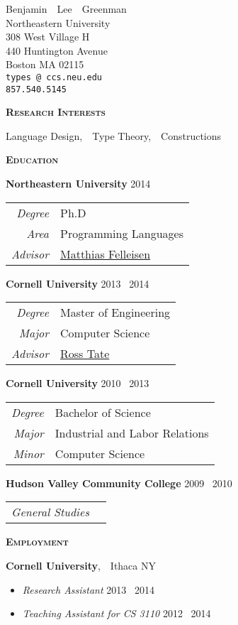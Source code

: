 \documentclass{article}
\makeatletter
\renewcommand{\maketitle}{
\begin{center}
  {\large{Benjamin~~Lee~~Greenman}}
\vspace{0.1cm}
\\Northeastern University
\\308 West Village H
\\440 Huntington Avenue
\\Boston MA 02115
\\\texttt{\fontseries{m}types\,@\,ccs.neu.edu}
\\\texttt{\fontseries{m}857.540.5145}
\end{center}
}
\newcommand{\mysection}[1]{\vspace{0.5cm}
\hspace{-1.3cm}\textsc{\textbf{#1}}~\hrulefill}
\newcommand{\mysubsection}[1]{\hspace{-0.7cm}\textbf{#1}}
\makeatother
\begin{document}
\maketitle


\mysection{Research Interests}

Language Design,~~Type Theory,~~Constructions

\mysection{Education}

\mysubsection{Northeastern University} \hfill 2014 \textendash\ \hphantom{2018}\\
\begin{tabular}{>{\it}r l}
Degree & Ph.D \\
Area & Programming Languages \\
Advisor & \href{http://ccs.neu.edu/home/matthias}{Matthias Felleisen}
\end{tabular}

\mysubsection{Cornell University} \hfill 2013 \textendash\ 2014\\
\begin{tabular}{>{\it}r l}
Degree & Master of Engineering\\
Major & Computer Science\\
Advisor & \href{http://www.cs.cornell.edu/~ross/}{Ross Tate}
\end{tabular}

\mysubsection{Cornell University} \hfill 2010 \textendash\ 2013\\
\begin{tabular}{>{\it}r l}
Degree & Bachelor of Science\\
Major & Industrial and Labor Relations\\
Minor & Computer Science\\
\end{tabular}

\mysubsection{Hudson Valley Community College} \hfill 2009 \textendash\ 2010 \\ 
\begin{tabular}{>{\it}r l}
General Studies & \\
\end{tabular}

\mysection{Employment}

\mysubsection{Cornell University},~~Ithaca NY
\begin{itemize}
\item \emph{Research Assistant} \hfill 2013 \textendash\ 2014
\item \emph{Teaching Assistant for CS 3110} \hfill 2012 \textendash\ 2014
\end{itemize}
\end{document}

